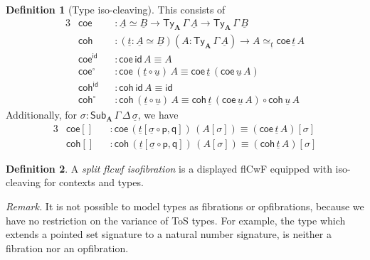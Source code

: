 \documentclass[12pt,a4paper,twoside,openany]{book}
\theoremstyle{remark}
\theoremstyle{definition}
\newtheorem{mydefinition}{Definition}
\theoremstyle{theorem}
\newcommand{\bs}[1]{\boldsymbol{#1}}
\newcommand{\id}{\mathsf{id}}
\newcommand{\Sub}{\mathsf{Sub}}
\newcommand{\Ty}{\mathsf{Ty}}
\newcommand{\ra}{\rightarrow}
\newcommand{\p}{\mathsf{p}}
\newcommand{\q}{\mathsf{q}}
\newcommand{\bA}{\bs{A}}
\newcommand{\ul}[1]{\underline{#1}}
\newcommand{\ulsigma}{\ul{\sigma}}
\newcommand{\ult}{\ul{t}}
\newcommand{\ulu}{\ul{u}}
\newcommand{\ulA}{\ul{A}}
\newcommand{\ulB}{\ul{B}}
\newcommand{\coe}{\mathsf{coe}}
\newcommand{\coh}{\mathsf{coh}}
\begin{document}
\begin{mydefinition}[Type iso-cleaving] This consists of
\begin{alignat*}{3}
  & \coe &&: \ulA \simeq \ulB \ra \Ty_{\bA}\,\Gamma\,\ulA \ra \Ty_{\bA}\,\Gamma\,\ulB\\
  & \coh &&: (\ult : \ulA \simeq \ulB)(A : \Ty_{\bA}\,\Gamma\,\ulA)
           \ra A \simeq_{\ult} \coe\,\ult\,A\\
  & \coe^{\id} && : \coe\,\id\,A \equiv A\\
  & \coe^{\circ} && : \coe\,(\ult\circ\ulu)\,A \equiv \coe\,\ult\,(\coe\,\ulu\,A)\\
  & \coh^{\id} &&: \coh\,\id\,A \equiv \id\\
  & \coh^{\circ} &&: \coh\,(\ult\circ\ulu)\,A \equiv \coh\,\ult\,(\coe\,\ulu\,A)
          \circ \coh\,\ulu\,A
\end{alignat*}
Additionally, for $\sigma : \Sub_{\bA}\,\Gamma\,\Delta\,\ulsigma$, we have
\begin{alignat*}{3}
  & \coe[] &&: \coe\,(\ult[\ulsigma\circ \p,\q])\,(A[\sigma]) \equiv (\coe\,\ult\,A)[\sigma]\\
  & \coh[] &&: \coh\,(\ult[\ulsigma\circ \p,\q])\,(A[\sigma]) \equiv (\coh\,\ult\,A)[\sigma]
\end{alignat*}

\end{mydefinition}

\begin{mydefinition} A \emph{split flcwf isofibration} is a displayed flCwF equipped with iso-cleaving for contexts and types.
\end{mydefinition}

\emph{Remark.} It is not possible to model types as fibrations or opfibrations,
because we have no restriction on the variance of ToS types. For example, the
type which extends a pointed set signature to a natural number signature, is
neither a fibration nor an opfibration.
\end{document}

